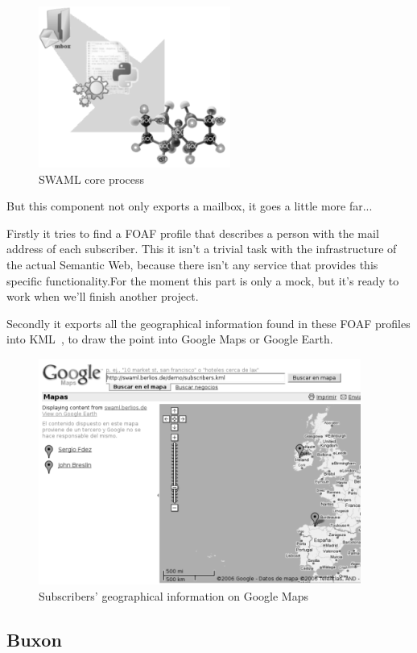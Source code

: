 \documentclass{llncs}
\begin{document}
\begin{figure}[ht]
 \centering
 \includegraphics[bb=0 0 238 200]{images/swaml-process.png}
 \caption{SWAML core process}
\end{figure}

But this component not only exports a mailbox, it goes a little more far...

Firstly it tries to find a FOAF profile that describes a person with the 
mail address of each subscriber. This it isn't a trivial task with the 
infrastructure of the actual Semantic Web, because there isn't any service 
that provides this specific functionality.For the moment this part is only 
a mock, but it's ready to work when we'll finish another project.

Secondly it exports all the geographical information found in these FOAF 
profiles into KML~\cite{Ricket2006}, to draw the point into Google Maps or 
Google Earth.

\begin{figure}[ht]
 \centering
 \includegraphics[bb=0 0 400 280]{images/googlemaps.png}
 \caption{Subscribers' geographical information on Google Maps}
\end{figure}

\subsection{Buxon}
\end{document}
